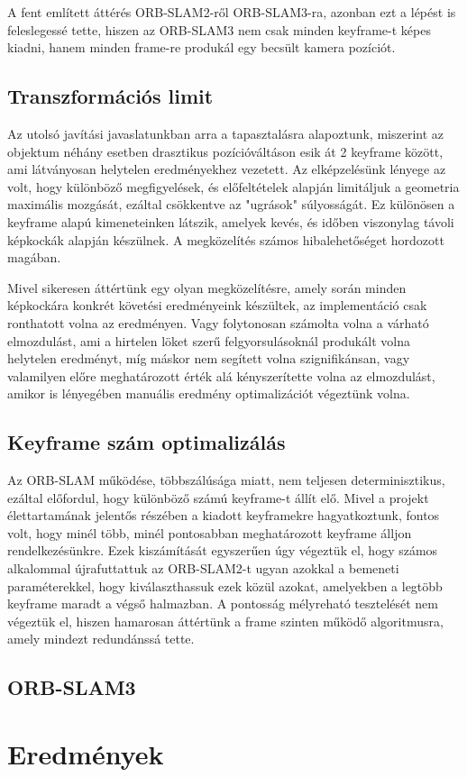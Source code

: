 A fent említett áttérés ORB-SLAM2-ről ORB-SLAM3-ra, azonban ezt a lépést is feleslegessé tette, hiszen az ORB-SLAM3 nem csak minden keyframe-t képes kiadni, hanem minden frame-re produkál egy becsült kamera pozíciót.

\subsection{Transzformációs limit}

Az utolsó javítási javaslatunkban arra a tapasztalásra alapoztunk, miszerint az objektum néhány esetben drasztikus pozícióváltáson esik át 2 keyframe között, ami látványosan helytelen eredményekhez vezetett.
Az elképzelésünk lényege az volt, hogy különböző megfigyelések, és előfeltételek alapján limitáljuk a geometria maximális mozgását, ezáltal csökkentve az "ugrások" súlyosságát.
Ez különösen a keyframe alapú kimeneteinken látszik, amelyek kevés, és időben viszonylag távoli képkockák alapján készülnek.
A megközelítés számos hibalehetőséget hordozott magában.

Mivel sikeresen áttértünk egy olyan megközelítésre, amely során minden képkockára konkrét követési eredményeink készültek, az implementáció csak ronthatott volna az eredményen.
Vagy folytonosan számolta volna a várható elmozdulást, ami a hirtelen löket szerű felgyorsulásoknál produkált volna helytelen eredményt, míg máskor nem segített volna szignifikánsan, vagy valamilyen előre meghatározott érték alá kényszerítette volna az elmozdulást, amikor is lényegében manuális eredmény optimalizációt végeztünk volna.

\subsection{Keyframe szám optimalizálás}

Az ORB-SLAM működése, többszálúsága miatt, nem teljesen determinisztikus, ezáltal előfordul, hogy különböző számú keyframe-t állít elő.
Mivel a projekt élettartamának jelentős részében a kiadott keyframekre hagyatkoztunk, fontos volt, hogy minél több, minél pontosabban meghatározott keyframe álljon rendelkezésünkre.
Ezek kiszámítását egyszerűen úgy végeztük el, hogy számos alkalommal újrafuttattuk az ORB-SLAM2-t ugyan azokkal a bemeneti paraméterekkel, hogy kiválaszthassuk ezek közül azokat, amelyekben a legtöbb keyframe maradt a végső halmazban.
A pontosság mélyreható tesztelését nem végeztük el, hiszen hamarosan áttértünk a frame szinten működő algoritmusra, amely mindezt redundánssá tette.

\subsection{ORB-SLAM3}


\section{Eredmények}

